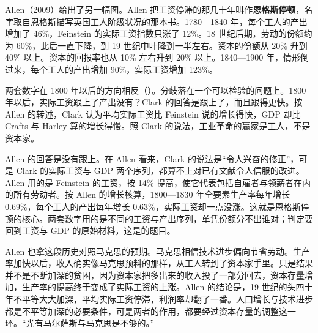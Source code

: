 Allen（2009）给出了另一幅图。Allen 把工资停滞的那几十年叫作\textbf{恩格斯停顿}，名字取自恩格斯描写英国工人阶级状况的那本书\cite{allen2009pause}。1780—1840 年，每个工人的产出增加了 46\%，Feinstein 的实际工资指数只涨了 12\%\cite{allen2009pause}。18 世纪后期，劳动的份额约为 60\%，此后一直下降，到 19 世纪中叶降到一半左右。资本的份额从 20\% 升到 40\% 以上\cite{allen2009pause}。资本的回报率也从 10\% 左右升到 20\% 以上\cite{allen2009pause}。1840—1900 年，情形倒过来，每个工人的产出增加 90\%，实际工资增加 123\%\cite{allen2009pause}。


两套数字在 1800 年以后的方向相反（）。分歧落在一个可以检验的问题上。1800 年以后，实际工资跟上了产出没有？Clark 的回答是跟上了，而且跟得更快。按 Allen 的转述，Clark 认为平均实际工资比 Feinstein 说的增长得快，GDP 却比 Crafts 与 Harley 算的增长得慢\cite{allen2009pause}。照 Clark 的说法，工业革命的赢家是工人，不是资本家\cite{allen2009pause}。

Allen 的回答是没有跟上。在 Allen 看来，Clark 的说法是“令人兴奋的修正”，可是 Clark 的实际工资与 GDP 两个序列，都算不上对已有文献令人信服的改进\cite{allen2009pause}。Allen 用的是 Feinstein 的工资，按 14\% 提高，使它代表包括自雇者与领薪者在内的所有劳动者\cite{allen2009pause}。按 Allen 的增长核算，1800—1830 年全要素生产率每年增长 0.69\%，每个工人的产出每年增长 0.63\%，实际工资却一点没涨\cite{allen2009pause}。这就是恩格斯停顿的核心。两套数字用的是不同的工资与产出序列，单凭份额分不出谁对；判定要回到工资与 GDP 的原始材料，这是的题目。

Allen 也拿这段历史对照马克思的预期。马克思相信技术进步偏向节省劳动\cite{allen2009pause}。生产率加快以后，收入确实像马克思预料的那样，从工人转到了资本家手里。只是结果并不是不断加深的贫困，因为资本家把多出来的收入投了一部分回去，资本存量增加，生产率的提高终于变成了实际工资的上涨\cite{allen2009pause}。Allen 的结论是，19 世纪的头四十年不平等大大加深，平均实际工资停滞，利润率却翻了一番\cite{allen2009pause}。人口增长与技术进步都是不平等加深的必要条件，可是两者的作用，都要经过资本存量的调整这一环。“光有马尔萨斯与马克思是不够的。”\cite{allen2009pause}


